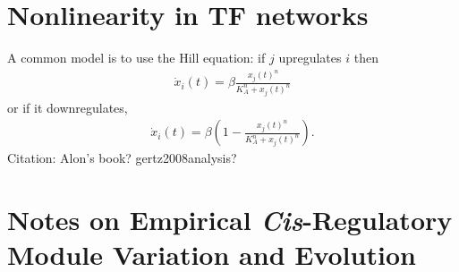 \documentclass[9 pt]{article}
\begin{document}
\section{Nonlinearity in TF networks}

A common model is to use the Hill equation:
if $j$ upregulates $i$ then
\begin{align}
    \dot x_i(t) = \beta \frac{x_j(t)^n}{ K_A^n + x_j(t)^n}
\end{align}
or if it downregulates,
\begin{align}
    \dot x_i(t) = \beta (1-\frac{x_j(t)^n}{ K_A^n + x_j(t)^n} ).
\end{align}
Citation: Alon's book? gertz2008analysis?

\section{Notes on Empirical \emph{Cis}-Regulatory Module Variation and Evolution}
\end{document}
